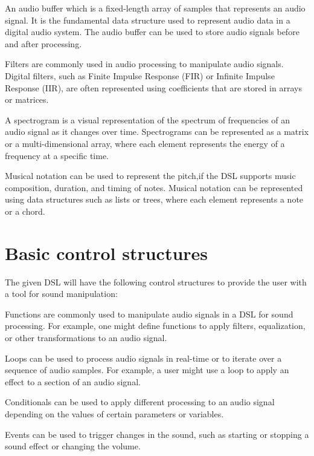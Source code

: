 \begin{itemize}
\hitem An audio buffer which is a fixed-length array of samples that represents an audio signal. It is the fundamental data structure used to represent audio data in a digital audio system. The audio buffer can be used to store audio signals before and after processing.

\hitem Filters are commonly used in audio processing to manipulate audio signals. Digital filters, such as Finite Impulse Response (FIR) or Infinite Impulse Response (IIR), are often represented using coefficients that are stored in arrays or matrices.

\hitem A spectrogram is a visual representation of the spectrum of 
frequencies of an audio signal as it changes over time. Spectrograms 
can be represented as a matrix or a multi-dimensional array, where 
each element represents the energy of a frequency at a specific 
time.

\hitem Musical notation can be used to represent the pitch,if the DSL supports music composition, duration, and timing of notes. Musical notation can be represented using data structures such as lists or trees, where each element represents a note or a chord.
\end{itemize}

\section{Basic control structures}
The given DSL will have the following control structures to provide the user with a tool for sound manipulation:

\begin{itemize}
\hitem Functions are commonly used to manipulate audio signals in a DSL for sound processing. For example, one might define functions to apply filters, equalization, or other transformations to an audio signal.

\hitem Loops can be used to process audio signals in real-time or to iterate over a sequence of audio samples. For example, a user might use a loop to apply an effect to a section of an audio signal.

\hitem Conditionals can be used to apply different processing to an audio signal depending on the values of certain parameters or 
variables. 

\hitem Events can be used to trigger changes in the sound, such 
as starting or stopping a sound effect or changing the volume.
\end{itemize}

